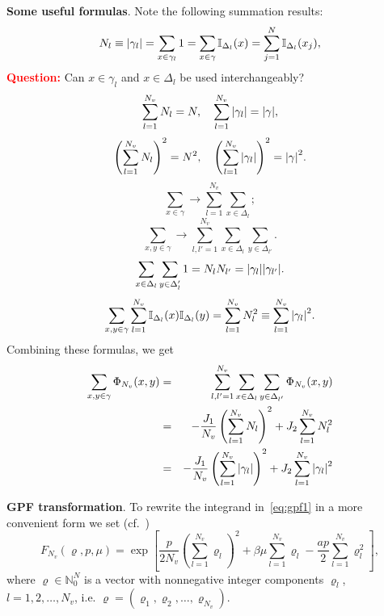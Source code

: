 \documentclass[12pt]{article}
\numberwithin{equation}{section}
\begin{document}
	\textbf{Some useful formulas}. Note the following summation results:
	\begin{equation}
		\label{eq:1}
		N_l \equiv \abs{\gamma_l} = \sum_{x \in \gamma_l} 1 = \sum_{x \in \gamma} \mathbb{I}_{\Delta_l}(x) = \sum_{j=1}^{N} \mathbb{I}_{\Delta_{l}}(x_j),
	\end{equation}
	\textbf{\textcolor{Red}{Question:}} Can $x \in \gamma_l$ and $x \in \Delta_l$ be used interchangeably?
	\begin{equation}
		\label{eq:2}
		\sum_{l=1}^{N_v} N_l = N, \quad \sum_{l=1}^{N_v} \abs{\gamma_l} = \abs{\gamma},
	\end{equation}
	\begin{equation}
		\label{eq:3}
		\left(\sum_{l=1}^{N_v} N_l \right)^2 = N^2, \quad \left(\sum_{l=1}^{N_v} \abs{\gamma_l} \right)^2 = \abs{\gamma}^2.
	\end{equation}
	\begin{equation}
		\label{eq:4}
		\sum_{x \in \gamma} \rightarrow \sum_{l=1}^{N_v} \sum_{x \in \Delta_l};
	\end{equation}
	\begin{equation}
		\label{eq:5}
		\sum_{x,y \in \gamma} \rightarrow \sum_{l,l'=1}^{N_v} \sum_{x \in \Delta_l} \sum_{y \in \Delta_{l'}}.
	\end{equation}
	\begin{equation}
		\label{eq:6}
		\sum_{x \in \Delta_l}\sum_{y \in \Delta_l'} 1 = N_l N_{l'} = \abs{\gamma_l} \abs{\gamma_{l'}}.
	\end{equation}
	\begin{equation}
		\label{eq:sumII}
		\sum_{x,y \in \gamma}\sum_{l=1}^{N_v} \mathbb{I}_{\Delta_l}(x) \mathbb{I}_{\Delta_{l}}(y) = \sum_{l=1}^{N_v} N_l^2 \equiv \sum_{l=1}^{N_v} \abs{\gamma_l}^2.
	\end{equation}
	Combining these formulas, we get
	\begin{eqnarray}
		\sum_{x,y \in \gamma} \Phi_{N_v}(x,y) & = & \sum_{l,l'=1}^{N_v} \sum_{x \in \Delta_l} \sum_{y \in \Delta_{l'}} \Phi_{N_v}(x,y) 
		\nonumber\\
		& = & - \frac{J_1}{N_v} \left(\sum_{l=1}^{N_v} N_l\right)^2 + J_2\sum_{l=1}^{N_v}N_l^2
		\\
		& = & - \frac{J_1}{N_v} \left(\sum_{l=1}^{N_v} \abs{\gamma_l}\right)^2 + J_2\sum_{l=1}^{N_v}\abs{\gamma_l}^2
	\end{eqnarray}
	
	\textbf{GPF transformation}. To rewrite the integrand in~\eqref{eq:gpf1} in a more convenient form we set (cf.~\cite[eq.~(2.7)]{KKD20})
	\begin{equation}
		F_{N_v}(\varrho, p, \mu) = \exp[\frac{p}{2N_v}\left(\sum_{l=1}^{N_v} \varrho_l\right)^2 + \beta\mu\sum_{l=1}^{N_v} \varrho_l - \frac{a p}{2} \sum_{l=1}^{N_v} \varrho_l^2],
	\end{equation}
	where $\varrho \in \mathbb{N}_0^N$ is a vector with nonnegative integer components $\varrho_l$, $l=1, 2, \ldots , N_v$, i.e. $\varrho = (\varrho_1, \varrho_2, \ldots, \varrho_{N_{v}})$.
	
\end{document}

